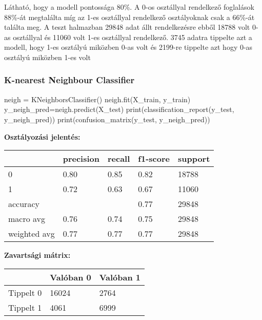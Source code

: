 \bigskip

Látható, hogy a modell pontossága 80\%. A 0-os osztállyal rendelkező foglalások 88\%-át megtalálta míg az 1-es osztállyal rendelkező osztályoknak csak a 66\%-át találta meg. A teszt halmazban 29848 adat állt rendelkezésre ebből 18788 volt 0-as osztállyal és 11060 volt 1-es osztállyal rendelkező. 3745 adatra tippelte azt a modell, hogy 1-es osztályú miközben 0-as volt és 2199-re tippelte azt hogy 0-as osztályú miközben 1-es volt

\subsubsection{K-nearest Neighbour Classifier}
\begin{python}
neigh = KNeighborsClassifier()
neigh.fit(X_train, y_train)
y_neigh_pred=neigh.predict(X_test)
print(classification_report(y_test, y_neigh_pred))
print(confusion_matrix(y_test, y_neigh_pred))
\end{python}

\medskip

\noindent \textbf{Osztályozási jelentés:}

\medskip

\begin{tabular}{|l|l|l|l|l|}
\hline
             & precision & recall & f1-score & support \\
             \hline
0            & 0.80      & 0.85   & 0.82     & 18788   \\
\hline
1            & 0.72      & 0.63   & 0.67     & 11060   \\
\hline
accuracy     &           &        & 0.77     & 29848   \\
\hline
macro avg    & 0.76      & 0.74   & 0.75     & 29848   \\
\hline
weighted avg & 0.77      & 0.77   & 0.77     & 29848  \\
\hline
\end{tabular}

\medskip

\noindent \textbf{Zavartsági mátrix:}

\medskip

\begin{tabular}{|l|l|l|}
\hline
          & Valóban 0 & Valóban 1 \\
          \hline
Tippelt 0 & 16024     & 2764      \\
\hline
Tippelt 1 & 4061      & 6999   \\
\hline
\end{tabular}

